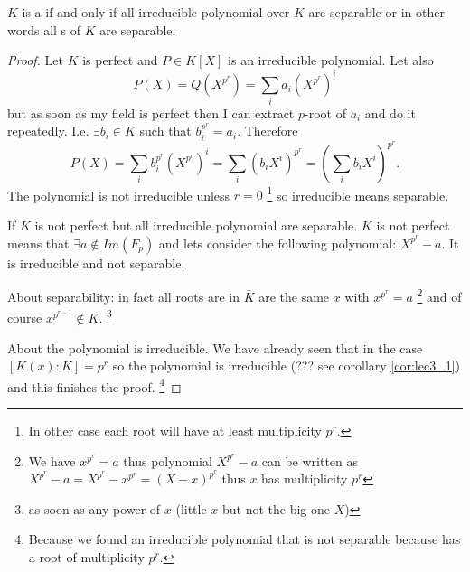 \begin{theorem}
  $K$ is a  if and only if all irreducible
  polynomial over $K$ 
  are separable or in other words all
  s of $K$ are separable. 
  \begin{proof}
    Let $K$ is perfect and $P \in K\left[X\right]$ is an irreducible
    polynomial. Let also
    \[
    P\left(X\right) = Q\left(X^{p^r}\right) =
    \sum_i a_i \left(X^{p^r}\right)^i
    \]
    but as soon as my field is perfect then I can extract $p$-root of
    $a_i$ and do it repeatedly. I.e. $\exists b_i \in K$ such that
    $b_i^{p^r} = a_i$. Therefore
    \[
    P\left(X\right) =
    \sum_i b_i^{p^r} \left(X^{p^r}\right)^i =
    \sum_i \left(b_i X^i\right)^{p^r} =
    \left( \sum_i b_i X^i\right)^{p^r}.
    \]
    The polynomial is not irreducible unless $r=0$
    \footnote{
      In other case each root will have at least multiplicity $p^r$.
    } so irreducible means separable.

    If $K$ is not perfect but all irreducible polynomial are
    separable. $K$ is not perfect means that $\exists a \notin
    Im\left(F_p\right)$ and lets consider the following polynomial:
    $X^{p^r} - a$. It is irreducible and not separable.

    About separability:
    in fact all roots are in $\bar{K}$ are
    the same $x$ with $x^{p^r} = a$
    \footnote{
      We have $x^{p^r} = a$ thus polynomial
      $X^{p^r} - a$ can be written as
      $X^{p^r} - a = X^{p^r} - x^{p^r} = \left(X - x\right)^{p^r}$
      thus $x$ has multiplicity $p^r$
    }
    and of course
    $x^{p^{r-1}} \notin K$.
    \footnote{
      as soon as any power of $x$ (little $x$ but not the big one $X$)
    }

    About the polynomial is irreducible.
    We have already seen that in the case
    $\left[K\left(x\right): K\right] = p^r$ so the polynomial is
    irreducible (??? see corollary \ref{cor:lec3_1}) and this finishes
    the proof.
    \footnote{
      Because we found an irreducible polynomial that is not
      separable because has a root of multiplicity $p^r$.
      }
  \end{proof}
  \label{thm:lec3_4}
\end{theorem}

